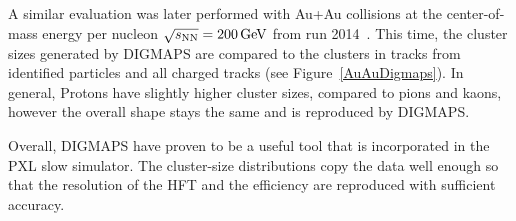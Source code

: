 A similar evaluation was later performed with Au+Au collisions at the center-of-mass energy per nucleon $\sqrt{s_\text{NN}} = \SI{200}{\giga\electronvolt}$ from run 2014~\cite{KubaVyzkumak}\@. This time, the cluster sizes generated by DIGMAPS are compared to the clusters in tracks from identified particles and all charged tracks (see Figure~\ref{AuAuDigmaps})\@.  In general, Protons have slightly higher cluster sizes, compared to pions and kaons, however the overall shape stays the same and is reproduced by DIGMAPS.

Overall, DIGMAPS have proven to be a useful tool that is incorporated in the PXL slow simulator. The cluster-size distributions copy the data well enough so that the resolution of the HFT and the efficiency are reproduced with sufficient accuracy.
